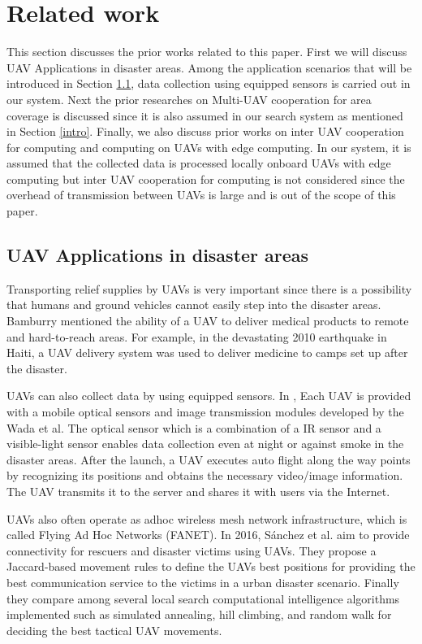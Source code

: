 \documentclass[journal]{IEEEtran}
\begin{document}
\section{Related work}
This section discusses the prior works related to this paper.
First we will discuss UAV Applications in disaster areas. 
Among the application scenarios that will be introduced in Section \ref{app}, data collection using equipped sensors is carried out in our system.
Next the prior researches on Multi-UAV cooperation for area coverage is discussed since it is also assumed in our search system as mentioned in Section \ref{intro}.
Finally, we also discuss prior works on inter UAV cooperation for computing and  computing on UAVs with edge computing.
In our system, it is assumed that the collected data is processed locally onboard UAVs with edge computing but inter UAV cooperation for computing is not considered since the overhead of transmission between UAVs is large and is out of the scope of this paper.

\subsection{UAV Applications in disaster areas}\label{app}
Transporting relief supplies by UAVs is very important since there is a possibility that humans and ground vehicles cannot easily step into the disaster areas.
Bamburry mentioned the ability of a UAV to deliver medical products to remote and hard-to-reach areas\cite{Bamburry2015}.
For example, in the devastating 2010 earthquake in Haiti, a UAV delivery system was used to deliver medicine to camps set up after the disaster\cite{May2015}.

UAVs can also collect data by using equipped sensors. In \cite{Wada2015}, Each UAV is provided with a mobile optical sensors and image transmission modules developed by the Wada et al. The optical sensor which is a combination of a IR sensor and a visible-light sensor enables data collection even at night or against smoke in the disaster areas.
After the launch, a UAV executes auto flight along the way points by recognizing its positions and  obtains the necessary video/image information. The UAV transmits it to the server and shares it with users via the Internet.

UAVs also often operate as adhoc wireless mesh network infrastructure, which is called Flying Ad Hoc Networks (FANET)\cite{Bekmezci2013}.
In 2016, S\'anchez et al. aim to provide connectivity for rescuers and disaster victims using UAVs\cite{Garcia2016}.
They propose a Jaccard-based movement rules to define the UAVs best positions for providing the best communication service to the victims in a urban disaster scenario.
Finally they compare among several local search computational intelligence algorithms implemented such as simulated annealing, hill climbing, and random walk for deciding the best tactical UAV movements.
\end{document}
